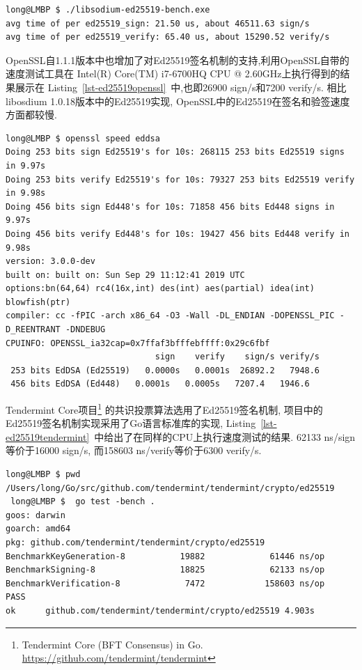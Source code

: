 

\begin{lstlisting}[caption=Ed25519 Speed in libsodium, label=lst-ed25519sodium-results]
long@LMBP $ ./libsodium-ed25519-bench.exe
avg time of per ed25519_sign: 21.50 us, about 46511.63 sign/s
avg time of per ed25519_verify: 65.40 us, about 15290.52 verify/s
\end{lstlisting}

OpenSSL自1.1.1版本中也增加了对Ed25519签名机制的支持,利用OpenSSL自带的速度测试工具在
Intel(R) Core(TM) i7-6700HQ CPU @ 2.60GHz上执行得到的结果展示在
Listing~\ref{lst-ed25519openssl}~中,也即26900 sign/s和7200 verify/s.
相比libosdium 1.0.18版本中的Ed25519实现, OpenSSL中的Ed25519在签名和验签速度方面都较慢.

\begin{lstlisting}[caption=Ed25519 Speed in OpenSSL, label=lst-ed25519openssl]
long@LMBP $ openssl speed eddsa
Doing 253 bits sign Ed25519's for 10s: 268115 253 bits Ed25519 signs in 9.97s
Doing 253 bits verify Ed25519's for 10s: 79327 253 bits Ed25519 verify in 9.98s
Doing 456 bits sign Ed448's for 10s: 71858 456 bits Ed448 signs in 9.97s
Doing 456 bits verify Ed448's for 10s: 19427 456 bits Ed448 verify in 9.98s
version: 3.0.0-dev
built on: built on: Sun Sep 29 11:12:41 2019 UTC
options:bn(64,64) rc4(16x,int) des(int) aes(partial) idea(int) blowfish(ptr)
compiler: cc -fPIC -arch x86_64 -O3 -Wall -DL_ENDIAN -DOPENSSL_PIC -D_REENTRANT -DNDEBUG
CPUINFO: OPENSSL_ia32cap=0x7ffaf3bfffebffff:0x29c6fbf
                              sign    verify    sign/s verify/s
 253 bits EdDSA (Ed25519)   0.0000s   0.0001s  26892.2   7948.6
 456 bits EdDSA (Ed448)   0.0001s   0.0005s   7207.4   1946.6
\end{lstlisting}

Tendermint Core项目\footnote{
Tendermint Core (BFT Consensus) in Go.
\url{https://github.com/tendermint/tendermint}}
的共识投票算法选用了Ed25519签名机制,
项目中的Ed25519签名机制实现采用了Go语言标准库的实现,
Listing~\ref{lst-ed25519tendermint}~中给出了在同样的CPU上执行速度测试的结果.
62133 ns/sign等价于16000 sign/s, 而158603 ns/verify等价于6300 verify/s.

\begin{lstlisting}[caption=Ed25519 Speed in Tendermint, label=lst-ed25519tendermint]
 long@LMBP $ pwd
/Users/long/Go/src/github.com/tendermint/tendermint/crypto/ed25519
 long@LMBP $  go test -bench .
goos: darwin
goarch: amd64
pkg: github.com/tendermint/tendermint/crypto/ed25519
BenchmarkKeyGeneration-8           19882             61446 ns/op
BenchmarkSigning-8                 18825             62133 ns/op
BenchmarkVerification-8             7472            158603 ns/op
PASS
ok      github.com/tendermint/tendermint/crypto/ed25519 4.903s
\end{lstlisting}

